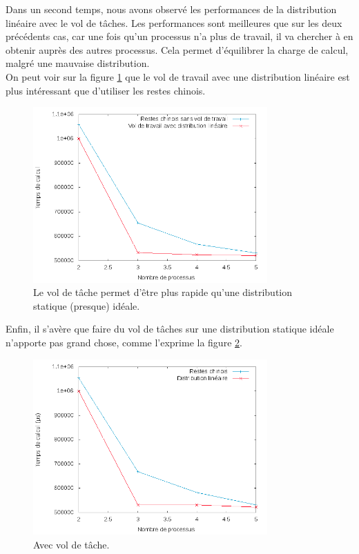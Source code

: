 Dans un second temps, nous avons observé les performances de la distribution linéaire avec le vol de tâches. Les performances sont meilleures que sur les deux précédents cas, car une fois qu'un processus n'a plus de travail, il va chercher à en obtenir auprès des autres processus. Cela permet d'équilibrer la charge de calcul, malgré une mauvaise distribution.\\
On peut voir sur la figure \ref{comp_chinois_vol} que le vol de travail avec une distribution linéaire est plus intéressant que d'utiliser les restes chinois.
\begin{figure}[H]
\centering
\includegraphics[width=0.8\textwidth]{comp_chinois_vol.png}
\caption{Le vol de tâche permet d'être plus rapide qu'une distribution statique (presque) idéale.}
\label{comp_chinois_vol}
\end{figure}

Enfin, il s'avère que faire du vol de tâches sur une distribution statique idéale n'apporte pas grand chose, comme l'exprime la figure \ref{vol_chinois_lin}.
\begin{figure}[H]
\centering
\includegraphics[width=0.8\textwidth]{vol_chinois_lin.png}
\caption{Avec vol de tâche.}
\label{vol_chinois_lin}
\end{figure}
